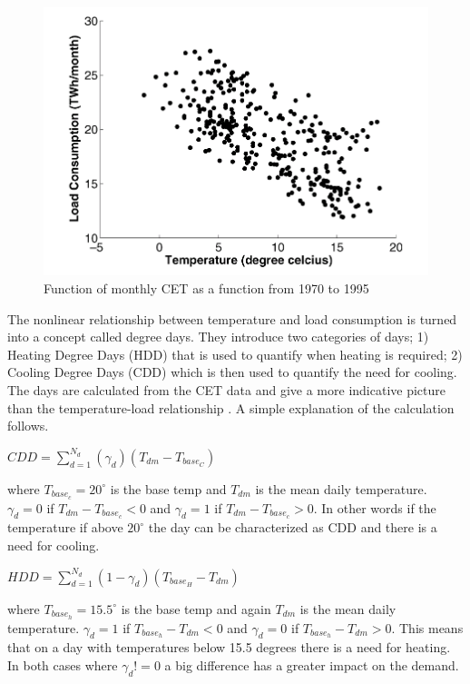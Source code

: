 \documentclass[twoside,11pt,openright]{report}
\begin{document}
\begin{figure}[h!]
\centering
\includegraphics[width=0.8\linewidth,natwidth=898,natheight=587]{billeder/MeanMonthlyDemandEngland.png}
\caption{Function of monthly CET as a function from 1970 to 1995 \cite{19}}
\label{fig:CET}
\end{figure}
The nonlinear relationship between temperature and load consumption is turned into a concept called degree days. They introduce two categories of days; 1) Heating Degree Days (HDD) that is used to quantify when heating is required; 2) Cooling Degree Days (CDD) which is then used to quantify the need for cooling. The days are calculated from the CET data and give a more indicative picture than the temperature-load relationship \cite{19}. A simple explanation of the calculation follows.
\begin{center}
$CDD=\sum\limits_{d=1}^{N_{d}}(\gamma_{d})(T_{dm}-T_{base_{C}})$
\end{center} 
 
where $T_{base_{c}} = 20^{\circ}$ is the base temp and $T_{dm}$ is the mean daily temperature. $\gamma_{d} = 0$ if $T_{dm}-T_{base_{c}} < 0$ and $\gamma_{d} = 1$ if $T_{dm}-T_{base_{c}} > 0$. In other words if the temperature if above $20^{\circ}$ the day can be characterized as CDD and there is a need for cooling.
\begin{center}
$HDD=\sum\limits_{d=1}^{N_{d}}(1-\gamma_{d})(T_{base_{H}}-T_{dm})$
\end{center} 

where $T_{base_{h}} = 15.5^{\circ}$ is the base temp and again $T_{dm}$ is the mean daily temperature. $\gamma_{d} = 1$ if $T_{base_{h}}-T_{dm} < 0$ and $\gamma_{d} = 0$ if $T_{base_{h}}-T_{dm} > 0$. This means that on a day with temperatures below 15.5 degrees there is a need for heating. In both cases where $\gamma_{d} != 0$ a big difference has a greater impact on the demand.
\end{document}
